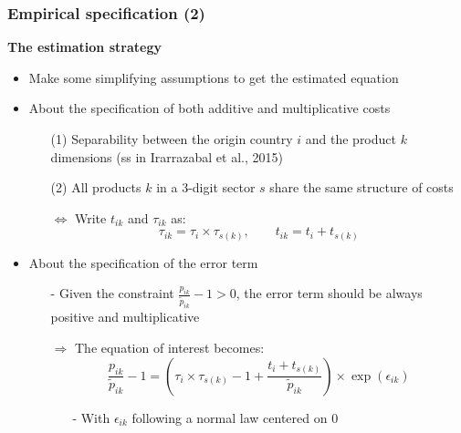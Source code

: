 \documentclass[10 pt,Helvetica, french]{beamer}
\begin{document}
\begin{frame}
\frametitle{Empirical specification (2)}
\textbf{The estimation strategy} \vspace{0.1cm}
\begin{itemize}
\item Make some simplifying assumptions to get the estimated equation \vspace{0.1cm}
\item About the specification of both additive and multiplicative costs  \vspace{0.1cm}
\begin{itemize}
\item[(1)] Separability between the origin country $i$ and the product $k$ dimensions (ss in Irarrazabal et al., 2015)\vspace{0.1cm}
\item[(2)] All products $k$ in a 3-digit sector $s$ share the same structure of costs \vspace{0.1cm}
\item[$\Leftrightarrow$] Write $t_{ik}$ and $\tau_{ik}$ as:
\footnotesize
\begin{equation}
 \tau_{ik} = \tau_{i} \times \tau_{s(k)}, \qquad t_{ik} = t_{i} + t_{s(k)} \label{eq:specifTC}
 \end{equation}
 \normalsize
\end{itemize}
\item About the specification of the error term \vspace{0.1cm}
\begin{itemize}
\item[-] Given the constraint $\frac{p_{ik}}{\widetilde{p}_{ik}} -1>0$, the error term should be always positive and multiplicative \vspace{0.1cm}
\item[$\Rightarrow$] The equation of interest becomes:
\footnotesize
$$\frac{p_{ik}}{\widetilde{p}_{ik}}-1 =\left(\tau_{i} \times \tau_{s(k)} -1+\frac{t_{i} + t_{s(k)}}{\widetilde{p}_{ik}} \right)\times \exp(\epsilon_{ik})$$
\normalsize
\begin{itemize}
\item[-] With $\epsilon_{ik}$ following a normal law centered on 0
\end{itemize}
\end{itemize}
\end{itemize}
\end{frame}
\end{document}
